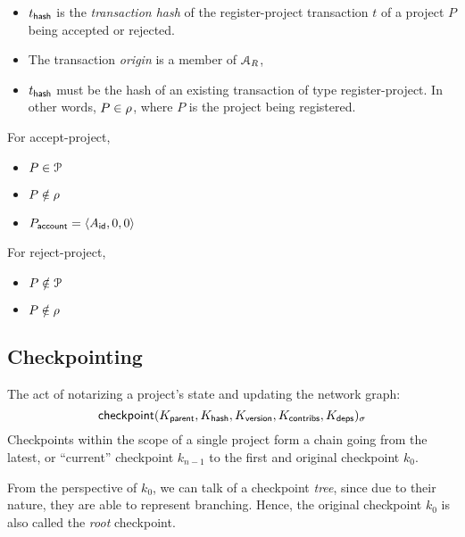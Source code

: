 \begin{itemize}
    \item $t_{\mathsf{hash}}$ is the \emph{transaction hash} of the
        \textsf{register-project} transaction $t$ of a project $P$
        being accepted or rejected.
\end{itemize}
\validation
\begin{itemize}
    \item The transaction \emph{origin} is a member of $\mathcal{A}_R$,
    \item $t_{\mathsf{hash}}$ must be the hash of an existing transaction of
        type \textsf{register-project}. In other words, $P \in \mathcal{\rho}$,
        where $P$ is the project being registered.
\end{itemize}

\bigskip
\noindent For \textsf{accept-project},
\newline\outputs
\begin{itemize}
    \item $P \in \mathcal{P}$
    \item $P \notin \mathcal{\rho}$
    \item $P_{\mathsf{account}} = \langle A_{\mathsf{id}}, 0, 0\rangle$
\end{itemize}
\bigskip
\noindent For \textsf{reject-project},
\newline\outputs
\begin{itemize}
    \item $P \notin \mathcal{P}$
    \item $P \notin \mathcal{\rho}$
\end{itemize}

\subsection{Checkpointing}
\label{s:checkpoint}
The act of notarizing a project's state and updating the network graph:
\[
    \operatorname{\mathsf{checkpoint}}\lparen K_{\mathsf{parent}}, K_{\mathsf{hash}}, K_{\mathsf{version}},
    K_{\mathsf{contribs}}, K_{\mathsf{deps}}\rparen_\sigma
\]
Checkpoints within the scope of a single project form a chain going from the
latest, or ``current'' checkpoint $k_{n-1}$ to the first and original
checkpoint $k_0$.

From the perspective of $k_0$, we can talk of a checkpoint \emph{tree}, since
due to their nature, they are able to represent branching. Hence, the original
checkpoint $k_0$ is also called the \emph{root} checkpoint.


